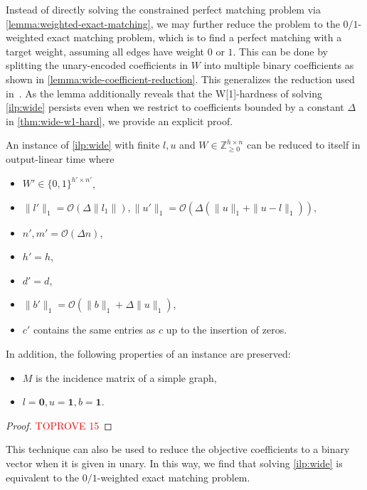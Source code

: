 \documentclass[a4paper,UKenglish,cleveref,thm-restate]{lipics-v2021}
\newcommand{\Z}{\mathbb Z}
\newcommand{\veczero}{\mathbf0}
\newcommand{\vecone}{\mathbf1}
\renewcommand{\O}{\mathcal O}
\begin{document}
Instead of directly solving the constrained perfect matching problem via \cref{lemma:weighted-exact-matching}, we may further reduce the problem to the $0/1$-weighted exact matching problem, which is to find a perfect matching with a target weight, assuming all edges have weight $0$ or $1$. This can be done by splitting the unary-encoded coefficients in $W$ into multiple binary coefficients as shown in \cref{lemma:wide-coefficient-reduction}. This generalizes the reduction used in~\cite{DBLP:journals/jacm/PapadimitriouY82}. As the lemma additionally reveals that the W[1]-hardness of solving \cref{ilp:wide} persists even when we restrict to coefficients bounded by a constant $\Delta$ in \cref{thm:wide-w1-hard}, we provide an explicit proof.

\begin{lemma}
    An instance of \cref{ilp:wide} with finite $l,u$ and $W\in\Z_{\ge0}^{h\times n}$ can be reduced to itself in output-linear time where
    \begin{itemize}
        \item $W'\in\{0,1\}^{h'\times n'}$,
        \item $\|l'\|_1=\O(\Delta\|l_1\|),\|u'\|_1=\O(\Delta(\|u\|_1+\|u-l\|_1))$,
        \item $n',m'=\O(\Delta n)$,
        \item $h'=h$,
        \item $d'=d$,
        \item $\|b'\|_1=\O(\|b\|_1+\Delta\|u\|_1)$,
        \item $c'$ contains the same entries as $c$ up to the insertion of zeros.
    \end{itemize}
    In addition, the following properties of an instance are preserved:
    \begin{itemize}
        \item $M$ is the incidence matrix of a simple graph,
        \item $l=\veczero,u=\vecone,b=\vecone$.
    \end{itemize}
    \label{lemma:wide-coefficient-reduction}
\end{lemma}

\begin{proof}\textcolor{red}{TOPROVE 15}\end{proof}

This technique can also be used to reduce the objective coefficients to a binary vector when it is given in unary. In this way, we find that solving \cref{ilp:wide} is equivalent to the $0/1$-weighted exact matching problem.
\end{document}
